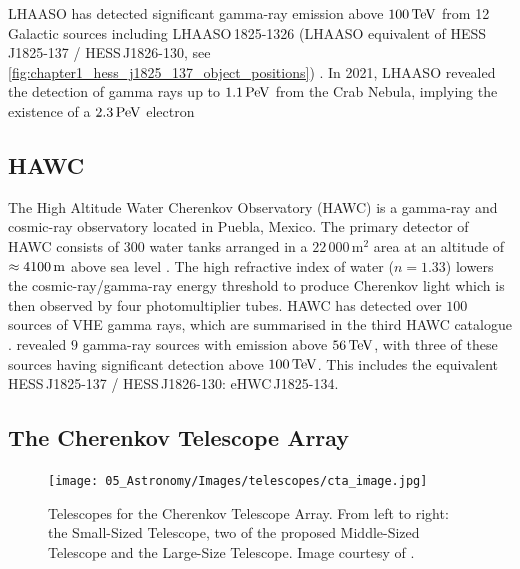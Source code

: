 \newpar
LHAASO has detected significant gamma-ray emission above $100\,\TeV$ from 12 Galactic sources including \mbox{LHAASO\,1825-1326} (LHAASO equivalent of \mbox{HESS\,J1825-137} / \mbox{HESS\,J1826-130}, see \autoref{fig:chapter1_hess_j1825_137_object_positions}) \citep{2021Natur.594...33C}. In 2021, LHAASO revealed the detection of gamma rays up to $1.1\,\PeV$ from the Crab Nebula, implying the existence of a $2.3\,\PeV$ electron \citep{doi:10.1126/science.abg5137}

\subsection{HAWC}

The High Altitude Water Cherenkov Observatory (HAWC) is a gamma-ray and cosmic-ray observatory located in Puebla, Mexico. The primary detector of HAWC consists of $300$ water tanks arranged in a $22\,000\,\si{\meter\squared}$ area at an altitude of $\approx 4100\,\si{\meter}$ above sea level \citep{2023NIMPA105268253A}. The high refractive index of water ($n=1.33$) lowers the cosmic-ray/gamma-ray energy threshold to produce Cherenkov light which is then observed by four photomultiplier tubes.
\newpar
HAWC has detected over $100$ sources of VHE gamma rays, which are summarised in the third HAWC catalogue \citep{2020ApJ...905...76A}. \cite{PhysRevLett.124.021102} revealed $9$ gamma-ray sources with emission above $56\,\TeV$, with three of these sources having significant detection above $100\,\TeV$. This includes the equivalent \mbox{HESS\,J1825-137} / \mbox{HESS\,J1826-130}: \mbox{eHWC\,J1825-134}.

\subsection{The Cherenkov Telescope Array} \label{05_cta}

\begin{figure}[ht]
    \centering
    \texttt{[image: 05\_Astronomy/Images/telescopes/cta\_image.jpg]}
    \caption{Telescopes for the Cherenkov Telescope Array. From left to right: the Small-Sized Telescope, two of the proposed Middle-Sized Telescope and the Large-Size Telescope. Image courtesy of \cite{cherenkov_telescope_array}.}
    \label{fig:chapter_2_cta}
\end{figure}

